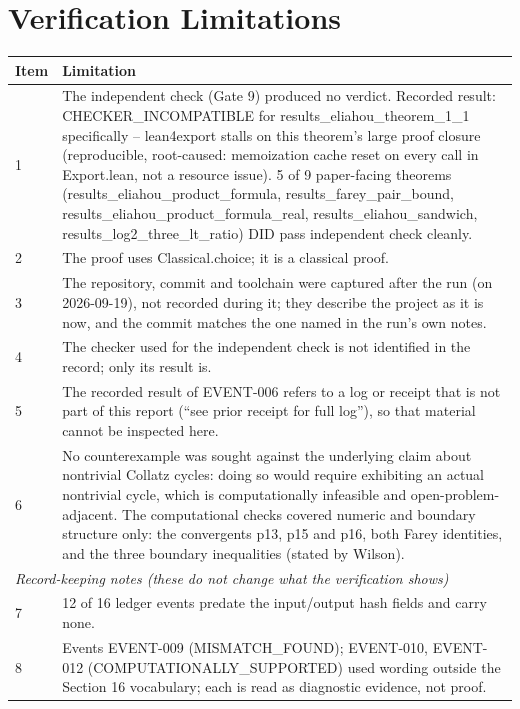 \documentclass[11pt]{article}
\begin{document}
\section{Verification Limitations}
\begin{longtable}{p{}p{}}
\toprule Item & Limitation \\ \midrule \endhead
1 & The independent check (Gate 9) produced no verdict. Recorded result: CHECKER\_INCOMPATIBLE for results\_eliahou\_theorem\_1\_1 specifically -- lean4export stalls on this theorem's large proof closure (reproducible, root-caused: memoization cache reset on every call in Export.lean, not a resource issue). 5 of 9 paper-facing theorems (results\_eliahou\_product\_formula, results\_farey\_pair\_bound, results\_eliahou\_product\_formula\_real, results\_eliahou\_sandwich, results\_log2\_three\_lt\_ratio) DID pass independent check cleanly. \\
2 & The proof uses Classical.choice; it is a classical proof. \\
3 & The repository, commit and toolchain were captured after the run (on 2026-09-19), not recorded during it; they describe the project as it is now, and the commit matches the one named in the run's own notes. \\
4 & The checker used for the independent check is not identified in the record; only its result is. \\
5 & The recorded result of EVENT-006 refers to a log or receipt that is not part of this report (``see prior receipt for full log''), so that material cannot be inspected here. \\
6 & No counterexample was sought against the underlying claim about nontrivial Collatz cycles: doing so would require exhibiting an actual nontrivial cycle, which is computationally infeasible and open-problem-adjacent. The computational checks covered numeric and boundary structure only: the convergents p13, p15 and p16, both Farey identities, and the three boundary inequalities (stated by Wilson). \\
\midrule \multicolumn{2}{l}{\textit{Record-keeping notes (these do not change what the verification shows)}} \\ \midrule
7 & 12 of 16 ledger events predate the input/output hash fields and carry none. \\
8 & Events EVENT-009 (MISMATCH\_FOUND); EVENT-010, EVENT-012 (COMPUTATIONALLY\_SUPPORTED) used wording outside the Section 16 vocabulary; each is read as diagnostic evidence, not proof. \\
\bottomrule
\end{longtable}
\end{document}
